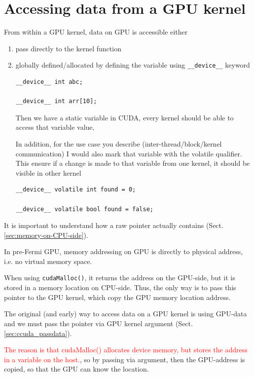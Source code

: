 \section{Accessing data from a GPU kernel}
\label{sec:accessing-data-from-GPU-kernel}


From within a GPU kernel, data on GPU is accessible either 
\begin{enumerate}
  \item pass directly to the kernel function
  
  
  \item globally defined/allocated by defining the variable using
  \verb!__device__! keyword 
\begin{verbatim}
__device__ int abc;

__device__ int arr[10];

\end{verbatim}
Then we have a static variable in CUDA, every kernel should be able to access that variable value, 

In addition, for the use case you describe (inter-thread/block/kernel
communication) I would also mark that variable with the volatile qualifier.
This ensure if a change is made to that variable from one kernel, it should be
visible in other kernel
\begin{verbatim}
__device__ volatile int found = 0;

__device__ volatile bool found = false;
\end{verbatim}

  
  
\end{enumerate}

It is important to understand how a raw pointer actually contains (Sect.\ref{sec:memory-on-CPU-side}).

In pre-Fermi GPU, memory addressing on GPU is directly to physical address, i.e. no virtual memory space.

When using \verb!cudaMalloc()!, it returns the address on the GPU-side, but it
is stored in a memory location on CPU-side. Thus, the only way is to pass this
pointer to the GPU kernel, which copy the GPU memory location address.




The original (and early) way to access data on a GPU kernel is using GPU-data
and we must pass the pointer via GPU kernel argument
(Sect.\ref{sec:ccuda_passdata}).

\textcolor{red}{The reason is that cudaMalloc() allocates device memory, but
stores the address in a variable on the host.}, so by passing via argument, then
the GPU-address is copied, so that the GPU can know the location.



